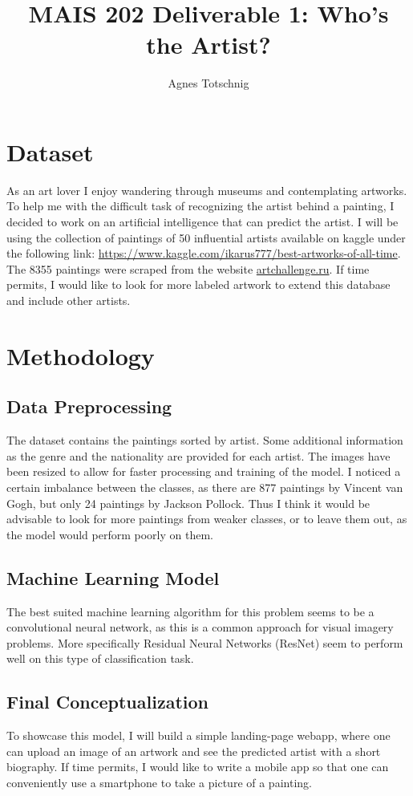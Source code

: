 \documentclass[12pt,a4paper]{article}
\title{MAIS 202 Deliverable 1: Who's the Artist?}
\author{Agnes Totschnig}
\date{}
\begin{document}
\maketitle

\section{Dataset}
As an art lover I enjoy wandering through museums and contemplating artworks. To help me with the difficult task of recognizing the artist behind a painting, I decided to work on an artificial intelligence that can predict the artist. I will be using the collection of paintings of 50 influential artists available on kaggle under the following link: \url{https://www.kaggle.com/ikarus777/best-artworks-of-all-time}. The 8355 paintings were scraped from the website \url{artchallenge.ru}. If time permits, I would like to look for more labeled artwork to extend this database and include other artists. \vspace{-0.2cm}


\section{Methodology}
\subsection{Data Preprocessing}
The dataset contains the paintings sorted by artist. Some additional information as the genre and the nationality are provided for each artist. The images have been resized to allow for faster processing and training of the model. I noticed a certain imbalance between the classes, as there are 877 paintings by Vincent van Gogh, but only 24 paintings by Jackson Pollock. Thus I think it would be advisable to look for more paintings from weaker classes, or to leave them out, as the model would perform poorly on them. 

\subsection{Machine Learning Model}
The best suited machine learning algorithm for this problem seems to be a convolutional neural network, as this is a common approach for visual imagery problems. More specifically Residual Neural Networks (ResNet) seem to perform well on this type of classification task.

\subsection{Final Conceptualization}
To showcase this model, I will build a simple landing-page webapp, where one can upload an image of an artwork and see the predicted artist with a short biography. If time permits, I would like to write a mobile app so that one can conveniently use a smartphone to take a picture of a painting.
\end{document}
